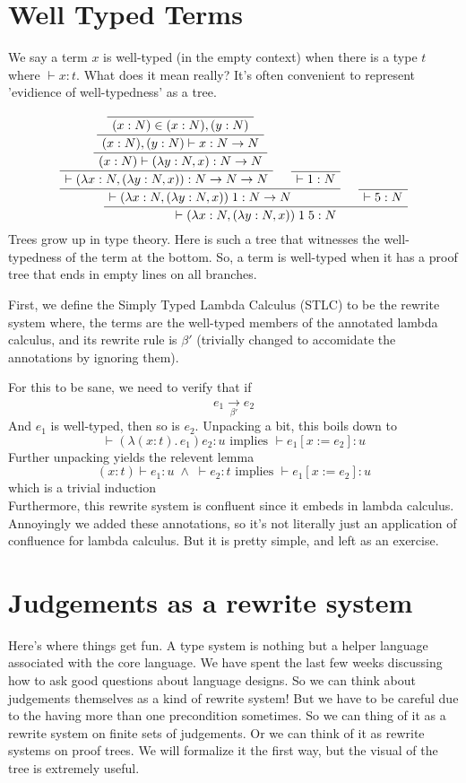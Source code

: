 \documentclass[12pt]{article}
\newenvironment{bprooftree}
  {\leavevmode\hbox\bgroup}
  {\DisplayProof\egroup}
\begin{document}
\section{Well Typed Terms}

We say a term $x$ is well-typed (in the empty context) when there is a type $t$ where $\vdash x:t$. 
What does it mean really?
It's often convenient to represent 'evidience of well-typedness' as a tree.

\[
\begin{bprooftree}
\AxiomC{}
  \AxiomC{}
  \UnaryInfC{$(x:N) \in (x:N),(y:N)$}
  \UnaryInfC{$(x:N),(y:N)\vdash x : N \rightarrow N$}
  \UnaryInfC{$(x:N)\vdash(\lambda y:N, x) : N \rightarrow N$}
\BinaryInfC{$\vdash(\lambda x:N, (\lambda y:N, x)) : N \rightarrow N \rightarrow N$}
  \AxiomC{}
  \UnaryInfC{$\vdash 1 : N$}
\BinaryInfC{$\vdash(\lambda x:N, (\lambda y:N, x))\; 1 : N \rightarrow N$}
  \AxiomC{}
  \UnaryInfC{$\vdash 5 : N$}
\BinaryInfC{$\ \vdash (\lambda x:N, (\lambda y:N, x)) \;1\; 5 : N$ }
\end{bprooftree}
\]
Trees grow up in type theory.
Here is such a tree that witnesses the well-typedness of the term at the bottom.
So, a term is well-typed when it has a proof tree that ends in empty lines on all branches. 

First, we define the Simply Typed Lambda Calculus (STLC) to be the rewrite system where, the terms are the well-typed members of the annotated lambda calculus, and its rewrite rule is $\beta'$ (trivially changed to accomidate the annotations by ignoring them).

For this to be sane, we need to verify that if 
\[
  e_1 \xrightarrow[\beta']{} e_2
\]
And $e_1$ is well-typed, then so is $e_2$.
Unpacking a bit, this boils down to 
\[
  \vdash (\lambda (x:t).\, e_1) e_2 : u \text{ implies }
  \vdash e_1[ x := e_2] : u
\]
Further unpacking yields the relevent lemma
\[
  (x : t) \vdash e_1 : u \;\land\; \vdash e_2 : t \text{ implies } \vdash e_1 [x := e_2] : u
\]
which is a trivial induction 
\\\newline
Furthermore, this rewrite system is confluent since it embeds in lambda calculus.
Annoyingly we added these annotations, so it's not literally just an application of confluence for lambda calculus.
But it is pretty simple, and left as an exercise.

\section{Judgements as a rewrite system}
Here's where things get fun.
A type system is nothing but a helper language associated with the core language. 
We have spent the last few weeks discussing how to ask good questions about language designs.
So we can think about judgements themselves as a kind of rewrite system!
But we have to be careful due to the having more than one precondition sometimes.
So we can thing of it as a rewrite system on finite sets of judgements.
Or we can think of it as rewrite systems on proof trees. We will formalize it the first way, but the visual of the tree is extremely useful.
\end{document}
